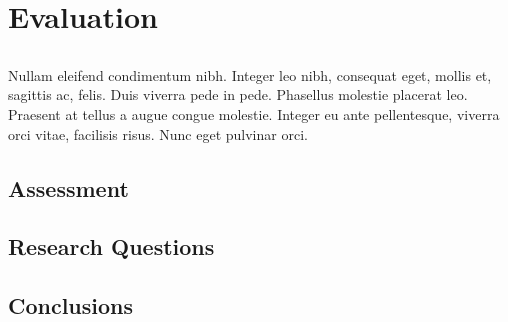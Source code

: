 \chapter{Evaluation} \label{chap:evaluation}

\section*{}

Nullam eleifend condimentum nibh. Integer leo nibh, consequat eget,
mollis et, sagittis ac, felis. Duis viverra pede in pede. Phasellus
molestie placerat leo. Praesent at tellus a augue congue molestie.
Integer eu ante pellentesque, viverra orci vitae, facilisis
risus. Nunc eget pulvinar orci.


\section{Assessment}

\section{Research Questions}

\section{Conclusions}